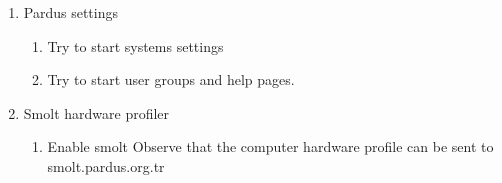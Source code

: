 \documentclass[a4paper,10pt]{article}
\begin{document}
\begin{enumerate}
\begin{enumerate}
    \item Pardus settings
        \begin{enumerate}
        \item Try to start systems settings
        
        \item Try to start user groups and help pages.

        \end{enumerate}

    \item Smolt hardware profiler
        \begin{enumerate}
        \item Enable smolt 
            Observe that the computer hardware profile can be sent to smolt.pardus.org.tr
        \end{enumerate}
    \end{enumerate}
\end{enumerate}
\end{document}
